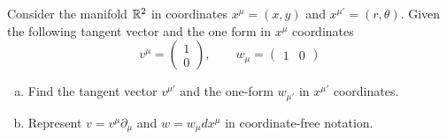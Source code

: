 \documentclass{article}
\begin{document}
 			\begin{exe}
 				Consider the manifold $\mathbb{R}^2$ in coordinates $x^\mu = (x,y)$ and $x^{\mu'} = (r, \theta)$. Given the following tangent vector and the one form in $x^\mu$ coordinates $$ v^\mu = \begin{pmatrix}
 					1 \\ 0
 				\end{pmatrix}, \quad\quad w_\mu = \begin{pmatrix}
 				1 & 0
 			\end{pmatrix}$$
 				\begin{enumerate}[(a)]
 					\item Find the tangent vector $v^{\mu'}$ and the one-form $w_{\mu'}$ in $x^{\mu'}$ coordinates.
 					\item Represent $v = v^\mu \partial_\mu$ and $w = w_\mu dx^\mu$ in coordinate-free notation.
 				\end{enumerate}
 			\end{exe}
\end{document}
